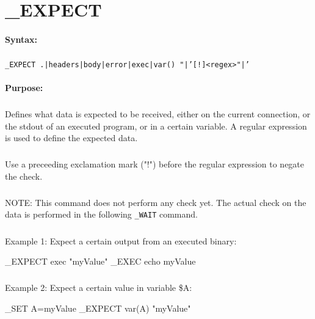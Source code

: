
\newpage
\section{\_EXPECT}
\label{cmd:_EXPECT}

\paragraph{Syntax:}
\subparagraph{}
\texttt{\_EXPECT .|headers|body|error|exec|var() "|'[!]<regex>"|'}

\paragraph{Purpose:}
\subparagraph{}
Defines what data is expected to be received, either on the current connection, 
or the stdout of an executed program, or in a certain variable. 
A regular expression is used to define the expected data.

\subparagraph{}
Use a preceeding exclamation mark ("!") before the regular expression 
to negate the check.

\subparagraph{}
NOTE: This command does not perform any check yet. The actual check 
on the data is performed in the following \texttt{\_WAIT} command. 

\subparagraph{}
Example 1: Expect a certain output from an executed binary:

\begin{usplisting}
    _EXPECT exec "myValue"
    _EXEC echo myValue
\end{usplisting}

\subparagraph{}
Example 2: Expect a certain value in variable \$A:

\begin{usplisting}
    _SET A=myValue
    _EXPECT var(A) "myValue"
\end{usplisting}

